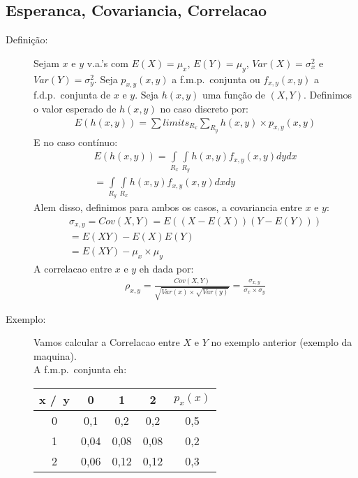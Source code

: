 \subsection{Esperanca, Covariancia, Correlacao}
\begin{description}
  \item [Definição:] Sejam $x$ e $y$ v.a.'s com $E(X)=\mu_{x}$, $E(Y)=\mu_{y}$, $Var(X)=\sigma_x^2$ e $Var(Y)=\sigma_y^2$. Seja $p_{x,y}(x,y)$ a f.m.p.\ conjunta ou $f_{x,y}(x,y)$ a f.d.p.\ conjunta de $x$ e $y$. Seja $h(x,y)$ uma função de $(X,Y)$. Definimos o valor esperado de $h(x,y)$ no caso discreto por:
    \begin{align}
      E \left(h \left(x,y\right)\right) = \sum limits_{R_{x}} \sum \limits_{R_{y}} h(x,y) \times p_{x,y}(x,y)
    \end{align}
    E no caso contínuo:
    \begin{align}
      E(h(x,y)) = \int \limits_{R_{x}} \int \limits_{R_{y}} h(x,y) f_{x,y}(x,y) dydx \\
      = \int \limits_{R_{y}} \int \limits_{R_{x}} h(x,y) f_{x,y}(x,y) dxdy
    \end{align}
    Alem disso, definimos para ambos os casos, a covariancia entre $x$ e $y$:
    \begin{align}
      \sigma_{x,y}  = Cov(X,Y) = E \left( \left(X-E(X)\right) \left(Y-E(Y)\right)\right) \\
      = E(XY) - E(X)E(Y)\\
      =E(XY)- \mu_{x}\times \mu_{y}
    \end{align}
    A correlacao entre $x$ e $y$ eh dada por:
    \begin{align}
      \rho_{x,y} = \frac{Cov(X,Y)}{\sqrt{Var(x) \times \sqrt{Var(y)}}}= \frac{\sigma_{x,y}}{\sigma_{x} \times \sigma_{y}}
    \end{align}
  \item [Exemplo:] Vamos calcular a Correlacao entre $X$ e $Y$ no exemplo anterior (exemplo da maquina).\\
    A f.m.p.\ conjunta eh:
  \begin{table}[H]
    \centering
    \begin{tabular}{c c c c c}
      \toprule
      x /\ y & 0 & 1 & 2 &$p_{x}(x)$ \\ \midrule
      0 & 0,1 & 0,2 & 0,2& 0,5\\ \midrule
      1 & 0,04 & 0,08& 0,08&0,2 \\ \midrule
      2 & 0,06 & 0,12 & 0,12 & 0,3 \\ \midrule 

\end{tabular}
\end{table}
\end{description}
